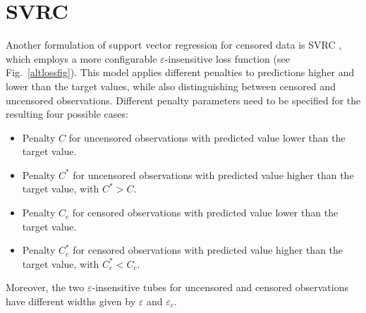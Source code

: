 \documentclass[12pt]{report}
\begin{document}
\section{SVRC}
Another formulation of support vector regression for censored data is SVRC \cite{khan08}, which employs a more configurable $\varepsilon$-insensitive loss function (see Fig.\ \ref{altlossfig}). This model applies different penalties to predictions higher and lower than the target values, while also distinguishing between censored and uncensored observations. Different penalty parameters need to be specified for the resulting four possible cases:
\begin{itemize}
\item Penalty $C$ for uncensored observations with predicted value lower than the target value.
\item Penalty $C^{*}$ for uncensored observations with predicted value higher than the target value, with $C^{*} > C$.
\item Penalty $C_{c}$ for censored observations with predicted value lower than the target value.
\item Penalty $C_{c}^{*}$ for censored observations with predicted value higher than the target value, with $C_{c}^{*} < C_{c}$.
\end{itemize}

Moreover, the two $\varepsilon$-insensitive tubes for uncensored and censored observations have different widths given by $\varepsilon$ and $\varepsilon_{c}$.
\end{document}
